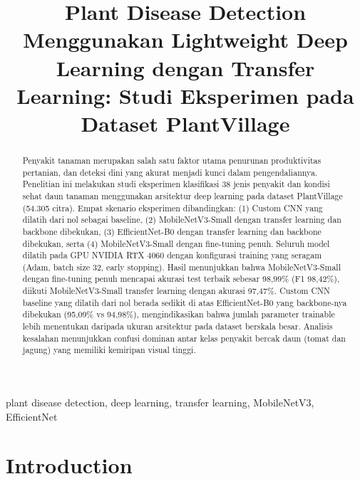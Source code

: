 \documentclass[conference,a4paper]{IEEEtran}
\begin{document}
\title{Plant Disease Detection Menggunakan Lightweight Deep Learning dengan Transfer Learning: Studi Eksperimen pada Dataset PlantVillage}

\author{
}

\maketitle

\begin{abstract}
Penyakit tanaman merupakan salah satu faktor utama penurunan produktivitas pertanian, dan deteksi dini yang akurat menjadi kunci dalam pengendaliannya. Penelitian ini melakukan studi eksperimen klasifikasi 38 jenis penyakit dan kondisi sehat daun tanaman menggunakan arsitektur deep learning pada dataset PlantVillage (54.305 citra). Empat skenario eksperimen dibandingkan: (1) Custom CNN yang dilatih dari nol sebagai baseline, (2) MobileNetV3-Small dengan transfer learning dan backbone dibekukan, (3) EfficientNet-B0 dengan transfer learning dan backbone dibekukan, serta (4) MobileNetV3-Small dengan fine-tuning penuh. Seluruh model dilatih pada GPU NVIDIA RTX 4060 dengan konfigurasi training yang seragam (Adam, batch size 32, early stopping). Hasil menunjukkan bahwa MobileNetV3-Small dengan fine-tuning penuh mencapai akurasi test terbaik sebesar 98,99\% (F1 98,42\%), diikuti MobileNetV3-Small transfer learning dengan akurasi 97,47\%. Custom CNN baseline yang dilatih dari nol berada sedikit di atas EfficientNet-B0 yang backbone-nya dibekukan (95,09\% vs 94,98\%), mengindikasikan bahwa jumlah parameter trainable lebih menentukan daripada ukuran arsitektur pada dataset berskala besar. Analisis kesalahan menunjukkan confusi dominan antar kelas penyakit bercak daun (tomat dan jagung) yang memiliki kemiripan visual tinggi.
\end{abstract}

\begin{IEEEkeywords}
plant disease detection, deep learning, transfer learning, MobileNetV3, EfficientNet
\end{IEEEkeywords}

\section{Introduction}
\end{document}
